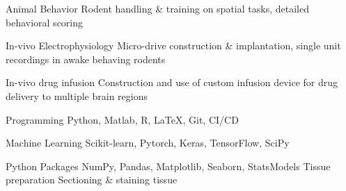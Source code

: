 

\begin{cvskills}

  \cvskill
    {Animal Behavior} %
    {Rodent handling \& training on spatial tasks, detailed behavioral scoring} %

  \cvskill
    {In-vivo Electrophysiology} %
    {Micro-drive construction \& implantation, single unit recordings in awake behaving rodents} %

  \cvskill
    {In-vivo drug infusion} %
    {Construction and use of custom infusion device for drug delivery to multiple brain regions} %

  \cvskill
    {Programming} %
    {Python, Matlab, R, \LaTeX, Git, CI/CD} %
    
  \cvskill
    {Machine Learning} %
    {Scikit-learn, Pytorch, Keras, TensorFlow, SciPy} %
    
  \cvskill
    {Python Packages} %
    {NumPy, Pandas, Matplotlib, Seaborn, StatsModels}
  \cvskill
    {Tissue preparation} %
    {Sectioning \& staining tissue} %

\end{cvskills}



